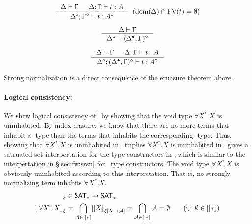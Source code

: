 \begin{theorem}
\label{thm:Fixierasetypingifree}
\[ \inference{ \Delta |- \Gamma & \Delta;\Gamma |- t : A}
                {\Delta^\circ;\Gamma^\circ |- t : A^\circ}
                {\enspace(\dom(\Delta)\cap\FV(t) = \emptyset)}
\]
\end{theorem}

\begin{theorem}
\label{thm:Fixierasetmctxivs}
\[ \inference{\Delta |- \Gamma}{\Delta^\circ |- (\Delta^\bullet,\Gamma)^\circ}
\]
\end{theorem}

\begin{theorem}
\label{thm:Fixierasetypingall}
\[ \inference{\Delta |- \Gamma & \Delta;\Gamma |- t : A}
                {\Delta^\circ;(\Delta^\bullet,\Gamma)^\circ |- t : A^\circ}
\]
\end{theorem}
Strong normalization is a direct consequence of the eruasure theorem above.

\paragraph{Logical consistency:}
We show logical consistency of \Fixi\ by showing that the void type
$\forall X^{*}.X$ is uninhabited. By index erasure, we know that
there are no more terms that inhabit a \Fixi-type than
the terms that inhabits the corresponding \Fixw-type.
Thus, showing that $\forall X^{*}.X$ is uninhabited in \Fixw\ implies
$\forall X^{*}.X$ is uninhabited in \Fixi. \citet{AbeMat04} gives
a satruated set interpertation for the type constructors in \Fixw,
which is similar to the interpertation in \S\ref{sec:fw:srsn} for
\Fw\ type constructors. The void type $\forall X^{*}.X$ is obviously
uninhabited according to this interpretation. That is, no strongly
normalizing term inhabits $\forall X^{*}.X$.
\begin{align*}
	[| \forall X^{*}.X |]_\xi &\in \SAT_{*} -> \SAT_{*} \\
	[| \forall X^{*}.X |]_\xi &
	= \bigcap_{\mathcal{A}\in[| * |]} [| X |]_{\xi[X\to\mathcal{A}]}
	= \bigcap_{\mathcal{A}\in[| * |]} \mathcal{A} = \emptyset
	\qquad(\because ~ \emptyset\in[| * |])
\end{align*}


